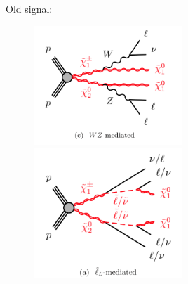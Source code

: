 \documentclass[mathserif,serif]{beamer}
\begin{document}
\begin{frame}
\small
Old signal:\\
\begin{figure}
\includegraphics[width=0.5\textwidth]{data/WZ.png}
\includegraphics[width=0.5\textwidth]{data/slepton.png}
\end{figure}
\end{frame}
\end{document}
